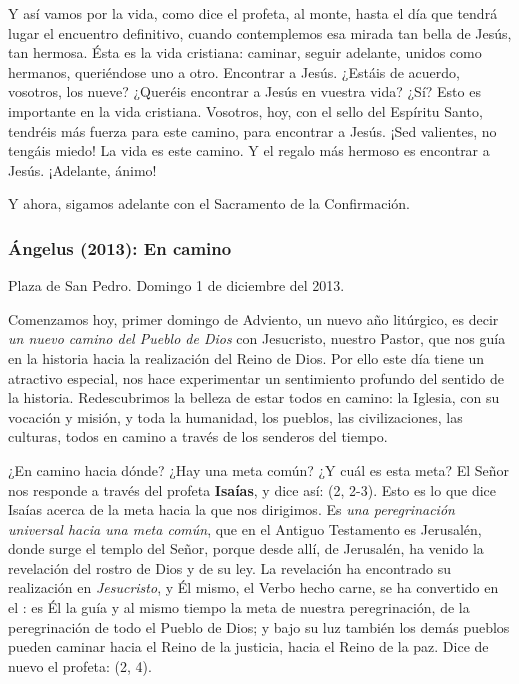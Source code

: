 Y así vamos por la vida, como dice el profeta, al monte, hasta el día que tendrá lugar el encuentro definitivo, cuando contemplemos esa mirada tan bella de Jesús, tan hermosa. Ésta es la vida cristiana: caminar, seguir adelante, unidos como hermanos, queriéndose uno a otro. Encontrar a Jesús. ¿Estáis de acuerdo, vosotros, los nueve? ¿Queréis encontrar a Jesús en vuestra vida? ¿Sí? Esto es importante en la vida cristiana. Vosotros, hoy, con el sello del Espíritu Santo, tendréis más fuerza para este camino, para encontrar a Jesús. ¡Sed valientes, no tengáis miedo! La vida es este camino. Y el regalo más hermoso es encontrar a Jesús. ¡Adelante, ánimo!

Y ahora, sigamos adelante con el Sacramento de la Confirmación.

\subsubsection{Ángelus (2013): En camino}

Plaza de San Pedro. Domingo 1 de diciembre del 2013.

Comenzamos hoy, primer domingo de Adviento, un nuevo año litúrgico, es decir \emph{un nuevo camino del Pueblo de Dios} con Jesucristo, nuestro Pastor, que nos guía en la historia hacia la realización del Reino de Dios. Por ello este día tiene un atractivo especial, nos hace experimentar un sentimiento profundo del sentido de la historia. Redescubrimos la belleza de estar todos en camino: la Iglesia, con su vocación y misión, y toda la humanidad, los pueblos, las civilizaciones, las culturas, todos en camino a través de los senderos del tiempo.

¿En camino hacia dónde? ¿Hay una meta común? ¿Y cuál es esta meta? El Señor nos responde a través del profeta \textbf{Isaías}, y dice así:  (2, 2-3). Esto es lo que dice Isaías acerca de la meta hacia la que nos dirigimos. Es \emph{una peregrinación universal hacia una meta común}, que en el Antiguo Testamento es Jerusalén, donde surge el templo del Señor, porque desde allí, de Jerusalén, ha venido la revelación del rostro de Dios y de su ley. La revelación ha encontrado su realización en \emph{Jesucristo}, y Él mismo, el Verbo hecho carne, se ha convertido en el : es Él la guía y al mismo tiempo la meta de nuestra peregrinación, de la peregrinación de todo el Pueblo de Dios; y bajo su luz también los demás pueblos pueden caminar hacia el Reino de la justicia, hacia el Reino de la paz. Dice de nuevo el profeta:  (2, 4).

